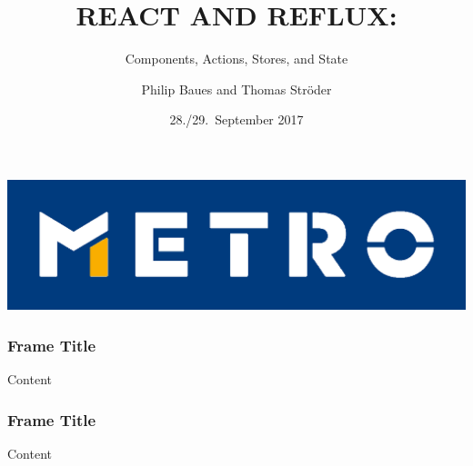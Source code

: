 \documentclass{beamer}
\begin{document}
\title[React and Reflux]{REACT AND REFLUX:}
\subtitle{Components, Actions, Stores, and State}
\author[P.\ Baues, T.\ Str\"oder]{Philip Baues and Thomas Str\"oder}
\date{28./29.\ September 2017}
\newcommand{\location}{\texttt{code.talks} Hamburg}

{
\begin{frame}[plain]
\centering
\includegraphics{metro2.png}
\end{frame}
}

{
\begin{frame}[plain]
\titlepage
\end{frame}
}

\begin{frame}\frametitle{Frame Title}
\centering
Content
\end{frame}

\begin{frame}\frametitle{Frame Title}
\centering
Content
\end{frame}
\end{document}

